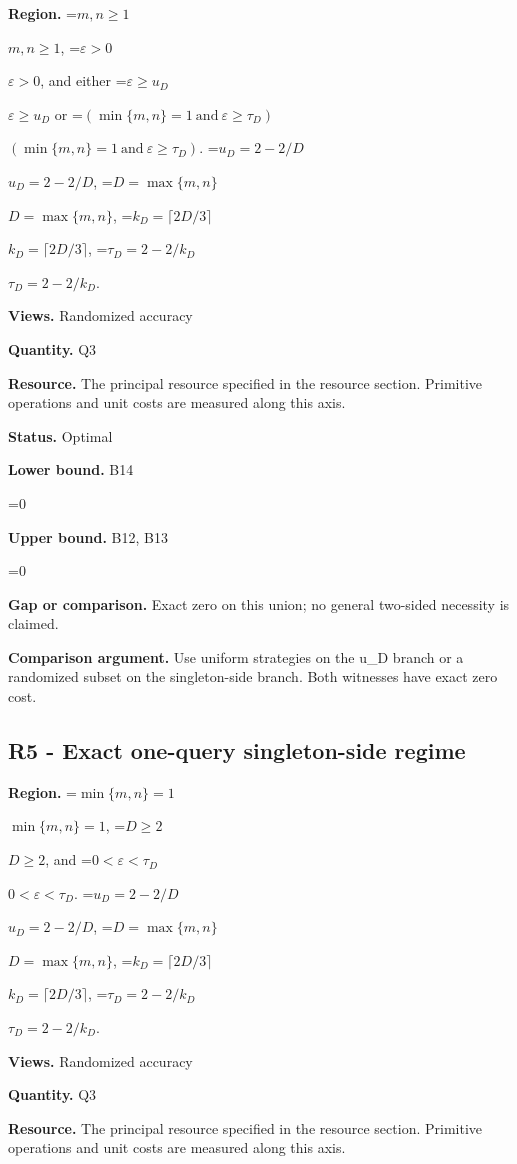 \documentclass[10pt,a4paper]{article}
\newcommand{\AtlasMath}[1]{\par\begingroup\centering\setbox0=\hbox{$\displaystyle #1$}\ifdim\wd0>1.4\linewidth\typeout{ATLAS WIDE FORMULA: \the\wd0}\fi\ifdim\wd0>\linewidth\resizebox{\linewidth}{!}{\box0}\else\box0\fi\par\endgroup}
\newcommand{\AtlasInlineMath}[1]{\begingroup\setbox0=\hbox{$#1$}\ifdim\wd0>.4\linewidth\endgroup\AtlasMath{#1}\else\endgroup$#1$\fi}
\begin{document}
\textbf{Region.} \AtlasInlineMath{m,n\ge1}, \AtlasInlineMath{\varepsilon>0}, and either \AtlasInlineMath{\varepsilon\ge u_D} or \AtlasInlineMath{(\min\{m,n\}=1\ \text{and}\ \varepsilon\ge\tau_D)}. \AtlasInlineMath{u_D=2-2/D}, \AtlasInlineMath{D=\max\{m,n\}}, \AtlasInlineMath{k_D=\lceil2D/3\rceil}, \AtlasInlineMath{\tau_D=2-2/k_D}.



\textbf{Views.} Randomized accuracy



\textbf{Quantity.} Q3



\textbf{Resource.} The principal resource specified in the resource section. Primitive operations and unit costs are measured along this axis.



\textbf{Status.} Optimal



\textbf{Lower bound.} B14



\AtlasMath{0}


\textbf{Upper bound.} B12, B13



\AtlasMath{0}


\textbf{Gap or comparison.} Exact zero on this union; no general two-sided necessity is claimed.



\textbf{Comparison argument.} Use uniform strategies on the u\_D branch or a randomized subset on the singleton-side branch. Both witnesses have exact zero cost.



\subsection{R5 - Exact one-query singleton-side regime}


\textbf{Region.} \AtlasInlineMath{\min\{m,n\}=1}, \AtlasInlineMath{D\ge2}, and \AtlasInlineMath{0<\varepsilon<\tau_D}. \AtlasInlineMath{u_D=2-2/D}, \AtlasInlineMath{D=\max\{m,n\}}, \AtlasInlineMath{k_D=\lceil2D/3\rceil}, \AtlasInlineMath{\tau_D=2-2/k_D}.



\textbf{Views.} Randomized accuracy



\textbf{Quantity.} Q3



\textbf{Resource.} The principal resource specified in the resource section. Primitive operations and unit costs are measured along this axis.
\end{document}
